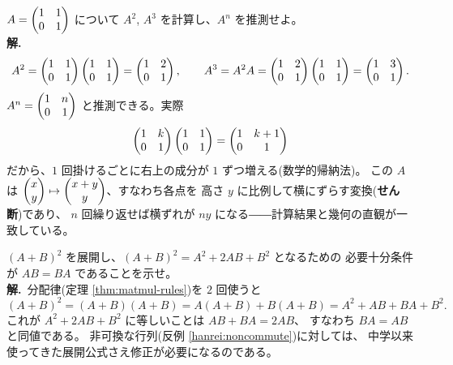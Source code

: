 \begin{rei}[例題・標準(累乗)]\label{rei:shear}
$A = \begin{pmatrix}1 & 1 \\ 0 & 1\end{pmatrix}$ について $A^2$, $A^3$ を計算し、$A^n$ を推測せよ。\\
\textbf{解.}\
\[
A^2 = \begin{pmatrix}1 & 1 \\ 0 & 1\end{pmatrix}\begin{pmatrix}1 & 1 \\ 0 & 1\end{pmatrix} = \begin{pmatrix}1 & 2 \\ 0 & 1\end{pmatrix},
\qquad
A^3 = A^2 A = \begin{pmatrix}1 & 2 \\ 0 & 1\end{pmatrix}\begin{pmatrix}1 & 1 \\ 0 & 1\end{pmatrix} = \begin{pmatrix}1 & 3 \\ 0 & 1\end{pmatrix}.
\]
$A^n = \begin{pmatrix}1 & n \\ 0 & 1\end{pmatrix}$ と推測できる。実際
\[
\begin{pmatrix}1 & k \\ 0 & 1\end{pmatrix}\begin{pmatrix}1 & 1 \\ 0 & 1\end{pmatrix} = \begin{pmatrix}1 & k + 1 \\ 0 & 1\end{pmatrix}
\]
だから、$1$ 回掛けるごとに右上の成分が $1$ ずつ増える(数学的帰納法)。
この $A$ は $\begin{pmatrix}x \\ y\end{pmatrix} \mapsto \begin{pmatrix}x + y \\ y\end{pmatrix}$、すなわち各点を
高さ $y$ に比例して横にずらす変換(\textbf{せん断})であり、
$n$ 回繰り返せば横ずれが $ny$ になる――計算結果と幾何の直観が一致している。
\end{rei}

\begin{rei}[例題・標準(証明)]\label{rei:matmul-expand}
$(A + B)^2$ を展開し、$(A + B)^2 = A^2 + 2AB + B^2$ となるための
必要十分条件が $AB = BA$ であることを示せ。\\
\textbf{解.}\ 分配律(定理 \ref{thm:matmul-rules})を $2$ 回使うと
\[
(A + B)^2 = (A + B)(A + B) = A(A + B) + B(A + B)
= A^2 + AB + BA + B^2.
\]
これが $A^2 + 2AB + B^2$ に等しいことは $AB + BA = 2AB$、
すなわち $BA = AB$ と同値である。
非可換な行列(反例 \ref{hanrei:noncommute})に対しては、
中学以来使ってきた展開公式さえ修正が必要になるのである。
\end{rei}

